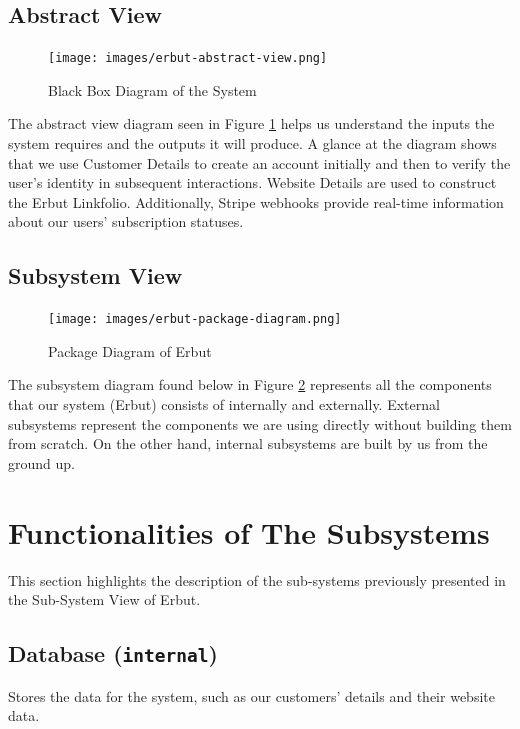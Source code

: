 \documentclass[a4paper]{report}
\begin{document}
\section{Abstract View}

\begin{figure}[h!]
    \centering
    \texttt{[image: images/erbut-abstract-view.png]}
    \caption{Black Box Diagram of the System}
    \label{fig:abstractview}
\end{figure}

The abstract view diagram seen in Figure \ref{fig:abstractview} helps us understand the inputs the system requires and the outputs it will produce. A glance at the diagram shows that we use Customer Details to create an account initially and then to verify the user's identity in subsequent interactions. Website Details are used to construct the Erbut Linkfolio. Additionally, Stripe webhooks provide real-time information about our users’ subscription statuses.

\section{Subsystem View}

\begin{figure}[h!]
    \centering
    \texttt{[image: images/erbut-package-diagram.png]}
    \caption{Package Diagram of Erbut}
    \label{fig:subsystemview}
\end{figure}

The subsystem diagram found below in Figure \ref{fig:subsystemview} represents all the components that our system (Erbut) consists of internally and externally. External subsystems represent the components we are using directly without building them from scratch. On the other hand, internal subsystems are built by us from the ground up.

\chapter{Functionalities of The Subsystems}

This section highlights the description of the sub-systems previously presented in the Sub-System View of Erbut.

\section{Database (\texttt{internal})}

Stores the data for the system, such as our customers’ details and their website data.
\end{document}
